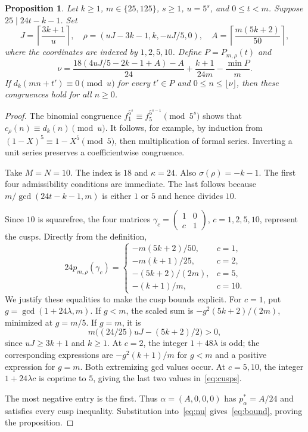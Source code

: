 \documentclass[11pt]{article}
\newtheorem{proposition}[theorem]{Proposition}
\begin{document}
\begin{proposition}\label{prop:certificate}
Let $k\ge1$, $m\in\{25,125\}$, $s\ge1$, $u=5^s$, and $0\le t<m$. Suppose $25\mid24t-k-1$. Set
\begin{equation}\label{eq:params}
 J=\left\lceil\frac{3k+1}{u}\right\rceil,
 \quad\rho=(uJ-3k-1,k,-uJ/5,0),
 \quad A=\left\lceil\frac{m(5k+2)}{50}\right\rceil,
\end{equation}
where the coordinates are indexed by $1,2,5,10$. Define $P=P_{m,\rho}(t)$ and
\begin{equation}\label{eq:bound}
 \nu=\frac{18(4uJ/5-2k-1+A)-A}{24}
       +\frac{k+1}{24m}-\frac{\min P}{m}.
\end{equation}
If $d_k(mn+t')\equiv0\pmod u$ for every $t'\in P$ and $0\le n\le\lfloor\nu\rfloor$, then these congruences hold for all $n\ge0$.
\end{proposition}
\begin{proof}
The binomial congruence $f_1^{5^s}\equiv f_5^{5^{s-1}}\pmod{5^s}$ shows that $c_\rho(n)\equiv d_k(n)\pmod u$. It follows, for example, by induction from $(1-X)^5\equiv1-X^5\pmod5$, then multiplication of formal series. Inverting a unit series preserves a coefficientwise congruence.

Take $M=N=10$. The index is $18$ and $\kappa=24$. Also $\sigma(\rho)=-k-1$. The first four admissibility conditions are immediate. The last follows because $m/\gcd(24t-k-1,m)$ is either $1$ or $5$ and hence divides $10$.

Since $10$ is squarefree, the four matrices $\gamma_c=\left(\begin{smallmatrix}1&0\\c&1\end{smallmatrix}\right)$, $c=1,2,5,10$, represent the cusps. Directly from the definition,
\begin{equation}\label{eq:cusps}
 24p_{m,\rho}(\gamma_c)=
 \begin{cases}
 -m(5k+2)/50,&c=1,\\
 -m(k+1)/25,&c=2,\\
 -(5k+2)/(2m),&c=5,\\
 -(k+1)/m,&c=10.
 \end{cases}
\end{equation}
We justify these equalities to make the cusp bounds explicit. For $c=1$, put $g=\gcd(1+24\lambda,m)$. If $g<m$, the scaled sum is $-g^2(5k+2)/(2m)$, minimized at $g=m/5$. If $g=m$, it is
\[
 m\bigl((24/25)uJ-(5k+2)/2\bigr)>0,
\]
since $uJ\ge3k+1$ and $k\ge1$. At $c=2$, the integer $1+48\lambda$ is odd; the corresponding expressions are $-g^2(k+1)/m$ for $g<m$ and a positive expression for $g=m$. Both extremizing gcd values occur. At $c=5,10$, the integer $1+24\lambda c$ is coprime to $5$, giving the last two values in~\eqref{eq:cusps}.

The most negative entry is the first. Thus $\alpha=(A,0,0,0)$ has $p^*_{\alpha}=A/24$ and satisfies every cusp inequality. Substitution into~\eqref{eq:nu} gives~\eqref{eq:bound}, proving the proposition.
\end{proof}
\end{document}
